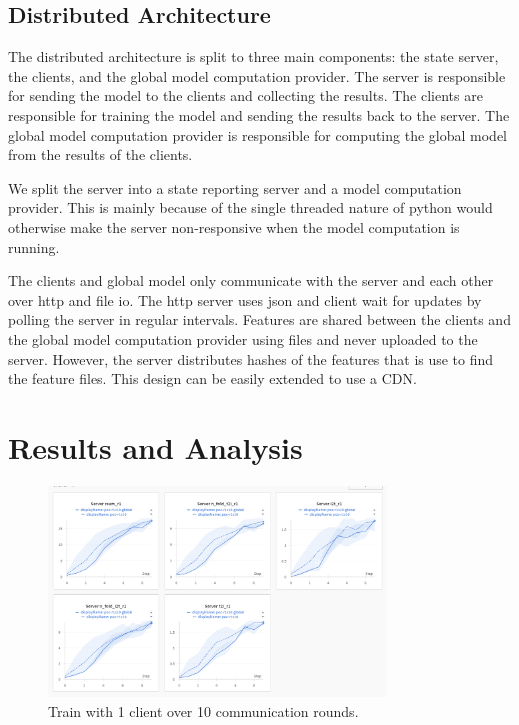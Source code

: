 \documentclass{article}
\begin{document}
\subsection{Distributed Architecture}
The distributed architecture is split to three main components: the state server, the clients, and the global model computation provider. The server is responsible for sending the model to the clients and collecting the results. The clients are responsible for training the model and sending the results back to the server. The global model computation provider is responsible for computing the global model from the results of the clients.

We split the server into a state reporting server and a model computation provider. This is mainly because of the single threaded nature of python would otherwise make the server non-responsive when the model computation is running. 

The clients and global model only communicate with the server and each other over http and file io. The http server uses json and client wait for updates by polling the server in regular intervals. Features are shared between the clients and the global model computation provider using files and never uploaded to the server. However, the server distributes hashes of the features that is use to find the feature files. This design can be easily extended to use a CDN.

\subsection{}


\section{Results and Analysis}

\begin{figure}[ht]
    \centering
    \includegraphics[width=0.8\textwidth]{poc-r1x10.png}
    \caption{Train with 1 client over 10 communication rounds.}
    \label{fig:r1x10}
\end{figure}
\end{document}
